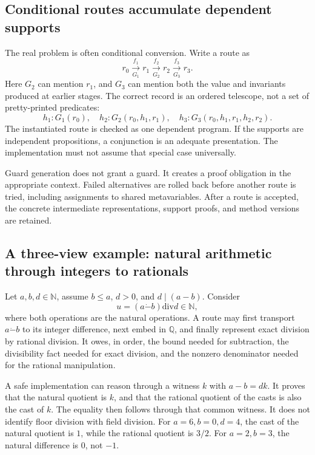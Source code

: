 \documentclass[11pt,a4paper]{article}
\newcommand{\N}{\mathbb N}
\newcommand{\Q}{\mathbb Q}
\theoremstyle{definition}
\begin{document}
\subsection{Conditional routes accumulate dependent supports}
The real problem is often conditional conversion. Write a route as
\[
 r_0\xrightarrow[G_1]{f_1}r_1
 \xrightarrow[G_2]{f_2}r_2
 \xrightarrow[G_3]{f_3}r_3.
\]
Here \(G_2\) can mention \(r_1\), and \(G_3\) can mention both the value and
invariants produced at earlier stages. The correct record is an ordered
telescope, not a set of pretty-printed predicates:
\[
 h_1:G_1(r_0),\quad
 h_2:G_2(r_0,h_1,r_1),\quad
 h_3:G_3(r_0,h_1,r_1,h_2,r_2).
\]
The instantiated route is checked as one dependent program. If the supports are
independent propositions, a conjunction is an adequate presentation. The
implementation must not assume that special case universally.

Guard generation does not grant a guard. It creates a proof obligation in the
appropriate context. Failed alternatives are rolled back before another route
is tried, including assignments to shared metavariables. After a route is
accepted, the concrete intermediate representations, support proofs, and method
versions are retained.

\subsection{A three-view example: natural arithmetic through integers to rationals}
Let \(a,b,d\in\N\), assume \(b\leq a\), \(d>0\), and \(d\mid(a-b)\). Consider
\[
 u=(a\mathbin{\dot-}b)\mathbin{\mathrm{div}}d\in\N,
\]
where both operations are the natural operations. A route may first transport
\(a\mathbin{\dot-}b\) to its integer difference, next embed in \(\Q\), and finally
represent exact division by rational division. It owes, in order, the bound
needed for subtraction, the divisibility fact needed for exact division, and the
nonzero denominator needed for the rational manipulation.

A safe implementation can reason through a witness \(k\) with
\(a-b=dk\). It proves that the natural quotient is \(k\), and that the rational
quotient of the casts is also the cast of \(k\). The equality then follows through
that common witness. It does not identify floor division with field division.
For \(a=6,b=0,d=4\), the cast of the natural quotient is \(1\), while the rational
quotient is \(3/2\). For \(a=2,b=3\), the natural difference is \(0\), not \(-1\).
\end{document}
